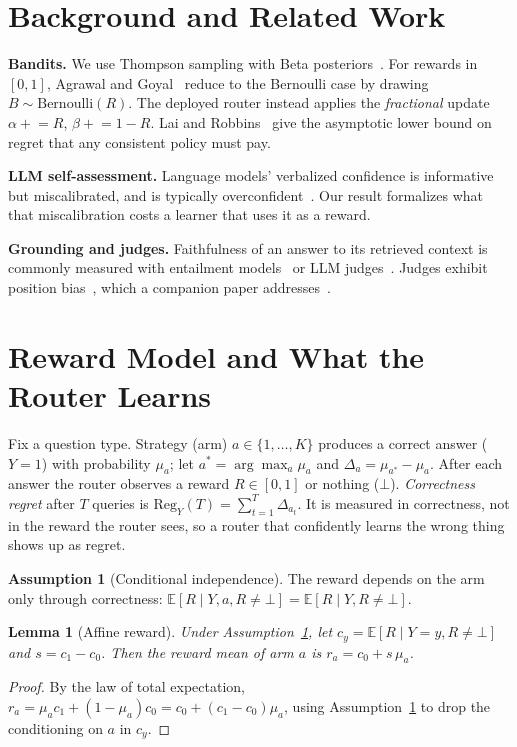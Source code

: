\documentclass[conference]{IEEEtran}
\newtheorem{lemma}{Lemma}
\theoremstyle{definition}
\newtheorem{assumption}{Assumption}
\theoremstyle{remark}
\newcommand{\E}{\mathbb{E}}
\begin{document}
\section{Background and Related Work}
\textbf{Bandits.} We use Thompson sampling with Beta posteriors~\cite{thompson1933,agrawal2012,russo2018}. For rewards in $[0,1]$, Agrawal and Goyal~\cite{agrawal2012} reduce to the Bernoulli case by drawing $B\sim\mathrm{Bernoulli}(R)$. The deployed router instead applies the \emph{fractional} update $\alpha\mathrel{+}=R$, $\beta\mathrel{+}=1-R$. Lai and Robbins~\cite{lai1985} give the asymptotic lower bound on regret that any consistent policy must pay.

\textbf{LLM self-assessment.} Language models' verbalized confidence is informative but miscalibrated, and is typically overconfident~\cite{kadavath2022,xiong2024}. Our result formalizes what that miscalibration costs a learner that uses it as a reward.

\textbf{Grounding and judges.} Faithfulness of an answer to its retrieved context is commonly measured with entailment models~\cite{honovich2022} or LLM judges~\cite{es2023ragas,zheng2023judge}. Judges exhibit position bias~\cite{zheng2023judge}, which a companion paper addresses~\cite{comp-audit}.

\section{Reward Model and What the Router Learns}\label{sec:theory}
Fix a question type. Strategy (arm) $a\in\{1,\dots,K\}$ produces a correct answer ($Y=1$) with probability $\mu_a$; let $a^*=\arg\max_a\mu_a$ and $\Delta_a=\mu_{a^*}-\mu_a$. After each answer the router observes a reward $R\in[0,1]$ or nothing ($\bot$). \emph{Correctness regret} after $T$ queries is $\mathrm{Reg}_Y(T)=\sum_{t=1}^T\Delta_{a_t}$. It is measured in correctness, not in the reward the router sees, so a router that confidently learns the wrong thing shows up as regret.

\begin{assumption}[Conditional independence]\label{ass:ci}
The reward depends on the arm only through correctness: $\E[R\mid Y, a, R\neq\bot]=\E[R\mid Y, R\neq\bot]$.
\end{assumption}

\begin{lemma}[Affine reward]\label{lem:affine}
Under Assumption~\ref{ass:ci}, let $c_y=\E[R\mid Y=y, R\neq\bot]$ and $s=c_1-c_0$. Then the reward mean of arm $a$ is $r_a=c_0+s\,\mu_a$.
\end{lemma}
\begin{proof}
By the law of total expectation, $r_a=\mu_a c_1+(1-\mu_a)c_0=c_0+(c_1-c_0)\mu_a$, using Assumption~\ref{ass:ci} to drop the conditioning on $a$ in $c_y$.
\end{proof}
\end{document}
